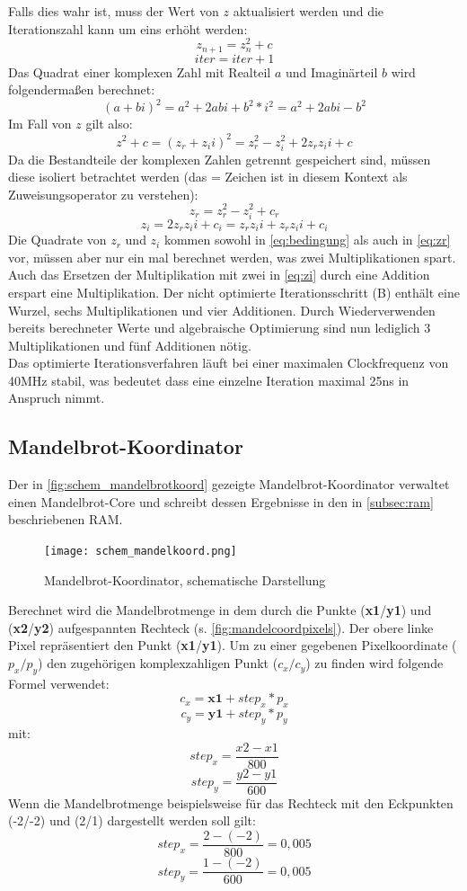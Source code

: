 \documentclass[a4paper,12pt,onesided]{report}
\begin{document}
Falls dies wahr ist, muss der Wert von $z$ aktualisiert werden und die Iterationszahl kann um eins erhöht werden:
\[z_{n+1} = z_n^2 + c\]
\[iter = iter + 1\]
Das Quadrat einer komplexen Zahl mit Realteil $a$ und Imaginärteil $b$ wird folgendermaßen berechnet:
\[(a + bi)^2 = a^2 + 2abi + b^2*i^2 = a^2 + 2abi - b^2\]
Im Fall von $z$ gilt also:
\[z^2+c=(z_r + z_ii)^2 = z_r^2 - z_i^2 + 2z_rz_ii + c\]
Da die Bestandteile der komplexen Zahlen getrennt gespeichert sind, müssen diese isoliert betrachtet werden (das = Zeichen ist in diesem Kontext als Zuweisungsoperator zu verstehen):
\begin{equation}
	\label{eq:zr}
	z_r = z_r^2 - z_i^2 + c_r
\end{equation}
\begin{equation}
	\label{eq:zi}
	z_i = 2z_rz_ii + c_i = z_rz_ii + z_rz_ii + c_i
\end{equation}
Die Quadrate von $z_r$ und $z_i$ kommen sowohl in \autoref{eq:bedingung} als auch in \autoref{eq:zr} vor, müssen aber nur ein mal berechnet werden, was zwei Multiplikationen spart.\\
Auch das Ersetzen der Multiplikation mit zwei in \autoref{eq:zi} durch eine Addition erspart eine Multiplikation.
Der nicht optimierte Iterationsschritt (B) enthält eine Wurzel, sechs Multiplikationen und vier Additionen.
Durch Wiederverwenden bereits berechneter Werte und algebraische Optimierung sind nun lediglich 3 Multiplikationen und fünf Additionen nötig.\\
Das optimierte Iterationsverfahren läuft bei einer maximalen Clockfrequenz von 40MHz stabil, was bedeutet dass eine einzelne Iteration maximal 25ns in Anspruch nimmt.

\subsection{Mandelbrot-Koordinator}
Der in \autoref{fig:schem_mandelbrotkoord} gezeigte Mandelbrot-Koordinator verwaltet einen Mandelbrot-Core und schreibt dessen Ergebnisse in den in \autoref{subsec:ram} beschriebenen RAM.

\begin{figure}[H]
	\centering
	\texttt{[image: schem\_mandelkoord.png]}
	\caption{Mandelbrot-Koordinator, schematische Darstellung}
	\label{fig:schem_mandelbrotkoord}
\end{figure}

Berechnet wird die Mandelbrotmenge in dem durch die Punkte (\textbf{x1}/\textbf{y1}) und (\textbf{x2}/\textbf{y2}) aufgespannten Rechteck (s. \autoref{fig:mandelcoordpixels}).
Der obere linke Pixel repräsentiert den Punkt (\textbf{x1}/\textbf{y1}).
Um zu einer gegebenen Pixelkoordinate ($p_x/p_y$) den zugehörigen komplexzahligen Punkt ($c_x/c_y$) zu finden wird folgende Formel verwendet:
\[c_x = \mathbf{x1} + step_x * p_x\] 
\[c_y = \mathbf{y1} + step_y * p_y\]
mit:
\[step_x = \frac{x2-x1}{800}\]
\[step_y = \frac{y2-y1}{600}\]
Wenn die Mandelbrotmenge beispielsweise für das Rechteck mit den Eckpunkten (-2/-2) und (2/1) dargestellt werden soll gilt:
\[step_x = \frac{2-(-2)}{800} = 0,005\]
\[step_y = \frac{1-(-2)}{600} = 0,005\]
\end{document}
